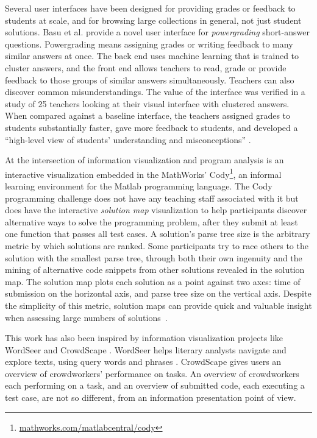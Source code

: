 \documentclass{sigchi}
\begin{document}
Several user interfaces have been designed for providing grades or feedback to students at scale, and for browsing large collections in general, not just student solutions. Basu et al. \citeyear{basupowergrading} provide a novel user interface for {\it powergrading} short-answer questions. Powergrading means assigning grades or writing feedback to many similar answers at once. The back end uses machine learning that is trained to cluster answers, and the front end allows teachers to read, grade or provide feedback to those groups of similar answers simultaneously. Teachers can also discover common misunderstandings. The value of the interface was verified in a study of 25 teachers looking at their visual interface with clustered answers. When compared against a baseline interface, the teachers assigned grades to students substantially faster, gave more feedback to students, and developed a ``high-level view of students' understanding and misconceptions'' \cite{basuDivideAndConquer}.

At the intersection of information visualization and program analysis is an interactive visualization embedded in the MathWorks' Cody\footnote{\url{mathworks.com/matlabcentral/cody}}, an informal learning environment for the Matlab programming language. The Cody programming challenge does not have any teaching staff associated with it but does have the interactive {\em solution map} visualization to help participants discover alternative ways to solve the programming problem, after they submit at least one function that passes all test cases. A solution's parse tree size is the arbitrary metric by which solutions are ranked. Some participants try to race others to the solution with the smallest parse tree, through both their own ingenuity and the mining of alternative code snippets from other solutions revealed in the solution map. The solution map plots each solution as a point against two axes: time of submission on the horizontal axis, and parse tree size on the vertical axis. Despite the simplicity of this metric, solution maps can provide quick and valuable insight when assessing large numbers of solutions~\cite{ICERGlassman}.

This work has also been inspired by information visualization projects like WordSeer \cite{wordseerlitcomp13,wordseercikm13} and CrowdScape \cite{crowdscape}. WordSeer helps literary analysts navigate and explore texts, using query words and phrases \cite{wordseerhcir11}. CrowdScape gives users an overview of crowdworkers' performance on tasks. An overview of crowdworkers each performing on a task, and an overview of submitted code, each executing a test case, are not so different, from an information presentation point of view.
\end{document}
